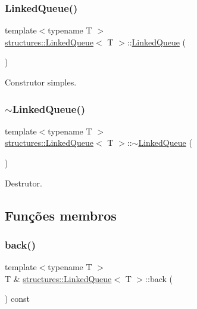 \subsubsection{\texorpdfstring{LinkedQueue()}{LinkedQueue()}}
{\footnotesize\ttfamily template$<$typename T $>$ \\
\mbox{\hyperlink{classstructures_1_1LinkedQueue}{structures\+::\+Linked\+Queue}}$<$ T $>$\+::\mbox{\hyperlink{classstructures_1_1LinkedQueue}{Linked\+Queue}} (\begin{DoxyParamCaption}{ }\end{DoxyParamCaption})}



Construtor simples. 

\mbox{\label{classstructures_1_1LinkedQueue_ad3f70a9465ecbf8868ad9206e2b01711}} 
\subsubsection{\texorpdfstring{$\sim$LinkedQueue()}{~LinkedQueue()}}
{\footnotesize\ttfamily template$<$typename T $>$ \\
\mbox{\hyperlink{classstructures_1_1LinkedQueue}{structures\+::\+Linked\+Queue}}$<$ T $>$\+::$\sim$\mbox{\hyperlink{classstructures_1_1LinkedQueue}{Linked\+Queue}} (\begin{DoxyParamCaption}{ }\end{DoxyParamCaption})}



Destrutor. 



\subsection{Funções membros}
\mbox{\label{classstructures_1_1LinkedQueue_ac69ee50f58e8501f7eaddec5b474a87c}} 
\subsubsection{\texorpdfstring{back()}{back()}}
{\footnotesize\ttfamily template$<$typename T $>$ \\
T \& \mbox{\hyperlink{classstructures_1_1LinkedQueue}{structures\+::\+Linked\+Queue}}$<$ T $>$\+::back (\begin{DoxyParamCaption}{ }\end{DoxyParamCaption}) const}



